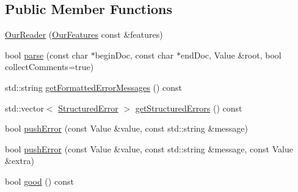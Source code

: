 \subsection*{Public Member Functions}
\begin{DoxyCompactItemize}
\item 
\hyperlink{class_json_1_1_our_reader_a48a850914b9c8d7781be172930c478e5}{Our\+Reader} (\hyperlink{class_json_1_1_our_features}{Our\+Features} const \&features)
\item 
bool \hyperlink{class_json_1_1_our_reader_aba4f8749aab7f02ec17f107e392caf80}{parse} (const char $\ast$begin\+Doc, const char $\ast$end\+Doc, Value \&root, bool collect\+Comments=true)
\item 
std\+::string \hyperlink{class_json_1_1_our_reader_ae9cbb7dbd9c6c96be37432e8dfa1afcb}{get\+Formatted\+Error\+Messages} () const 
\item 
std\+::vector$<$ \hyperlink{struct_json_1_1_our_reader_1_1_structured_error}{Structured\+Error} $>$ \hyperlink{class_json_1_1_our_reader_a02ef7871af3706754a233c36e6d489e9}{get\+Structured\+Errors} () const 
\item 
bool \hyperlink{class_json_1_1_our_reader_aef7aa4ca22ffaa38c401b16951d20e1e}{push\+Error} (const Value \&value, const std\+::string \&message)
\item 
bool \hyperlink{class_json_1_1_our_reader_ad43315cbb0d6804e3b7177e84a1ec53d}{push\+Error} (const Value \&value, const std\+::string \&message, const Value \&extra)
\item 
bool \hyperlink{class_json_1_1_our_reader_a048346238d703ad9aed06beb686e6102}{good} () const 
\end{DoxyCompactItemize}
